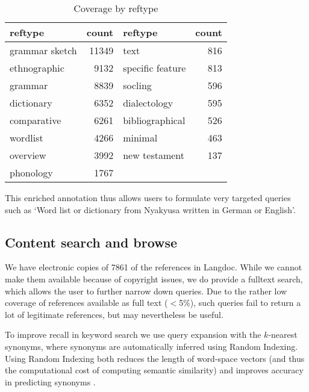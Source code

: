 \documentclass[10pt, a4paper]{article}
\begin{document}
\begin{table}
\begin{tabular}{lr||lr}
   reftype & count & reftype & count  \\
\hline
 grammar sketch & 11349 & text  		& 816 \\
 ethnographic 	& 9132  & specific feature 	& 813 \\
 grammar  	& 8839  & socling  		& 596 \\
 dictionary 	& 6352  & dialectology 		& 595 \\
 comparative 	& 6261  & bibliographical 	& 526 \\
 wordlist  	& 4266  & minimal  		& 463 \\
 overview  	& 3992  & new testament 	& 137 \\
 phonology 	& 1767  &   			& \\
\end{tabular}
\caption{Coverage by reftype}
\end{table}

This enriched annotation thus allows users to formulate very targeted queries such as `Word list or dictionary from Nyakyusa written in German or English'.

\subsection{Content search and browse}
We have electronic copies of 7861 of the references in Langdoc. While we cannot make them available because of copyright issues, we do provide a fulltext search, which allows the user to further narrow down queries. Due to the rather low coverage of references available as full text ($<$5\%), such queries fail to return a lot of legitimate references, but may nevertheless be useful. 

To improve recall in keyword search we use query expansion with the
$k$-nearest synonyms, where synonyms are automatically inferred using
Random Indexing. Using Random Indexing both reduces the length of
word-space vectors (and thus the computational cost of computing
semantic similarity) and improves accuracy in predicting synonyms
\cite{cl:Roselletal}.
\end{document}
